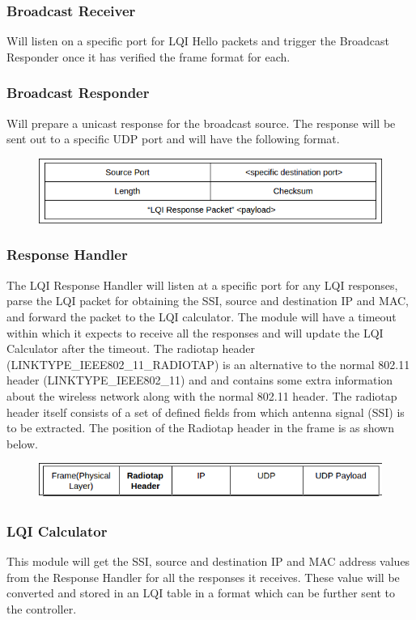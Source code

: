 \documentclass{article}
\begin{document}
\subsubsection{Broadcast Receiver}
Will listen on a specific port for LQI Hello packets and trigger the Broadcast Responder once it has verified the frame
format for each. 
\subsubsection{Broadcast Responder} 
Will prepare a unicast response for the broadcast source. The response will be sent out to a specific UDP port and will
have the following format. %
\begin{figure}[H]
\centering
\includegraphics[width=\textwidth]{broadcast_responder}
\end{figure}
\subsubsection{Response Handler} 
The LQI Response Handler will listen at a specific port for any LQI responses, parse the LQI packet for obtaining the
SSI, source and destination IP and MAC, and forward the packet to the LQI calculator. The module will have a timeout
within which it expects to receive all the responses and will update the LQI Calculator after the timeout. The radiotap
header (LINKTYPE\_IEEE802\_11\_RADIOTAP) is an alternative to the normal 802.11 header (LINKTYPE\_IEEE802\_11) and and
contains some extra information about the wireless network along with the normal 802.11 header. The radiotap header
itself consists of a set of defined fields from which antenna signal (SSI) is to be extracted. The position of the
Radiotap header in the frame is as shown below. 
\begin{figure}[H]
\centering
\includegraphics[width=\textwidth]{response_handler}
\end{figure}
\subsubsection{LQI Calculator} 
This module will get the SSI, source and destination IP and MAC address values from the Response Handler for all the
responses it receives. These value will be converted and stored in an LQI table in a format which can be further sent to
the controller.
\end{document}
